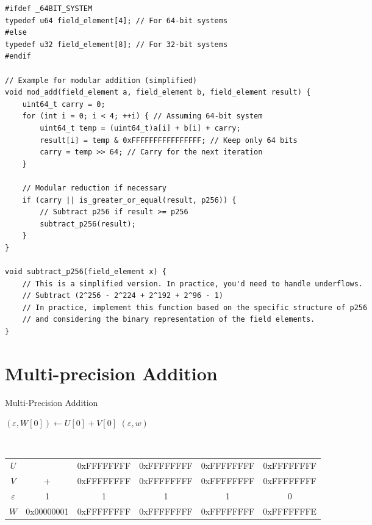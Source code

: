 \begin{lstlisting}[style=C]
#ifdef _64BIT_SYSTEM
typedef u64 field_element[4]; // For 64-bit systems
#else
typedef u32 field_element[8]; // For 32-bit systems
#endif

// Example for modular addition (simplified)
void mod_add(field_element a, field_element b, field_element result) {
	uint64_t carry = 0;
	for (int i = 0; i < 4; ++i) { // Assuming 64-bit system
		uint64_t temp = (uint64_t)a[i] + b[i] + carry;
		result[i] = temp & 0xFFFFFFFFFFFFFFFF; // Keep only 64 bits
		carry = temp >> 64; // Carry for the next iteration
	}
	
	// Modular reduction if necessary
	if (carry || is_greater_or_equal(result, p256)) {
		// Subtract p256 if result >= p256
		subtract_p256(result);
	}
}

void subtract_p256(field_element x) {
	// This is a simplified version. In practice, you'd need to handle underflows.
	// Subtract (2^256 - 2^224 + 2^192 + 2^96 - 1)
	// In practice, implement this function based on the specific structure of p256
	// and considering the binary representation of the field elements.
}
\end{lstlisting}

\newpage
\section{Multi-precision Addition}

\begin{algorithm}[H]
	\DontPrintSemicolon
	\caption{Multi-Precision Addition}
	\BlankLine
	$(\varepsilon,W[0])\gets U[0]+V[0]$\;
	\Return $(\varepsilon, w)$\;
\end{algorithm}
\begin{example}
\ \begin{table}[h!]\centering\renewcommand{\arraystretch}{1.25}
	{\ttfamily\begin{tabular*}{\textwidth}{@{\extracolsep{\fill}}cccccc}
	$U$ & & 0xFFFFFFFF & 0xFFFFFFFF & 0xFFFFFFFF & 0xFFFFFFFF \\
	$V$ & + & 0xFFFFFFFF & 0xFFFFFFFF & 0xFFFFFFFF & 0xFFFFFFFF \\
	$\varepsilon$ & 1 & 1 & 1 & 1 & 0 \\ \cline{2-6}
	$W$ & 0x00000001 & 0xFFFFFFFF & 0xFFFFFFFF & 0xFFFFFFFF & 0xFFFFFFFE \\
	\end{tabular*}}
\end{table}	
\end{example}


